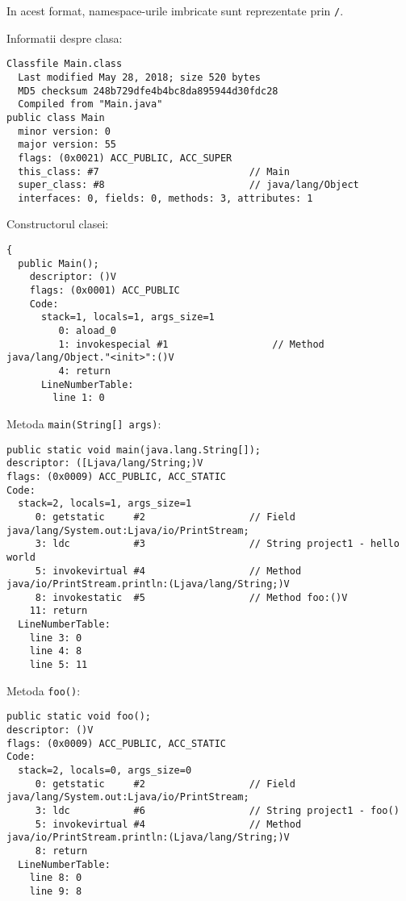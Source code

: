 In acest format, namespace-urile imbricate sunt reprezentate prin
\texttt{/}.

Informatii despre clasa:

\begin{lstlisting}
Classfile Main.class
  Last modified May 28, 2018; size 520 bytes
  MD5 checksum 248b729dfe4b4bc8da895944d30fdc28
  Compiled from "Main.java"
public class Main
  minor version: 0
  major version: 55
  flags: (0x0021) ACC_PUBLIC, ACC_SUPER
  this_class: #7                          // Main
  super_class: #8                         // java/lang/Object
  interfaces: 0, fields: 0, methods: 3, attributes: 1
\end{lstlisting}

Constructorul clasei:

\begin{lstlisting}
{
  public Main();
    descriptor: ()V
    flags: (0x0001) ACC_PUBLIC
    Code:
      stack=1, locals=1, args_size=1
         0: aload_0
         1: invokespecial #1                  // Method java/lang/Object."<init>":()V
         4: return
      LineNumberTable:
        line 1: 0
\end{lstlisting}

Metoda \texttt{main(String{[}{]}\ args)}:

\begin{lstlisting}
public static void main(java.lang.String[]);
descriptor: ([Ljava/lang/String;)V
flags: (0x0009) ACC_PUBLIC, ACC_STATIC
Code:
  stack=2, locals=1, args_size=1
     0: getstatic     #2                  // Field java/lang/System.out:Ljava/io/PrintStream;
     3: ldc           #3                  // String project1 - hello world
     5: invokevirtual #4                  // Method java/io/PrintStream.println:(Ljava/lang/String;)V
     8: invokestatic  #5                  // Method foo:()V
    11: return
  LineNumberTable:
    line 3: 0
    line 4: 8
    line 5: 11
\end{lstlisting}

Metoda \texttt{foo()}:

\begin{lstlisting}
public static void foo();
descriptor: ()V
flags: (0x0009) ACC_PUBLIC, ACC_STATIC
Code:
  stack=2, locals=0, args_size=0
     0: getstatic     #2                  // Field java/lang/System.out:Ljava/io/PrintStream;
     3: ldc           #6                  // String project1 - foo()
     5: invokevirtual #4                  // Method java/io/PrintStream.println:(Ljava/lang/String;)V
     8: return
  LineNumberTable:
    line 8: 0
    line 9: 8
\end{lstlisting}
